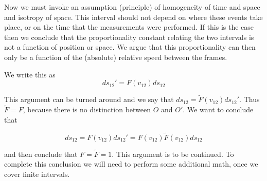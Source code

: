 Now we must invoke an assumption (principle) of homogeneity of time and space and isotropy of space.  This interval should not depend on where these events take place, or on the time that the measurements were performed.  If this is the case then we conclude that the proportionality constant relating the two intervals is not a function of position or space.  We argue that this proportionality can then only be a function of the (absolute) relative speed between the frames.

We write this as
\begin{equation}\label{eqn:relativisticElectrodynamicsL2:90}
ds_{12}' = F(v_{12}) ds_{12}
\end{equation}

This argument can be turned around and we say that $ds_{12} = \tilde{F}(v_{12}) ds_{12}'$.  Thus $\tilde{F} = F$, because there is no distinction between $O$ and $O'$.  We want to conclude that 

\begin{equation}\label{eqn:relativisticElectrodynamicsL2:100}
ds_{12} = F(v_{12}) ds_{12}' = F(v_{12}) \tilde{F}(v_{12}) ds_{12}
\end{equation}

and then conclude that $F = \tilde{F} = 1$.  This argument is to be continued.  To complete this conclusion we will need to perform some additional math, once we cover finite intervals.


\EndArticle

